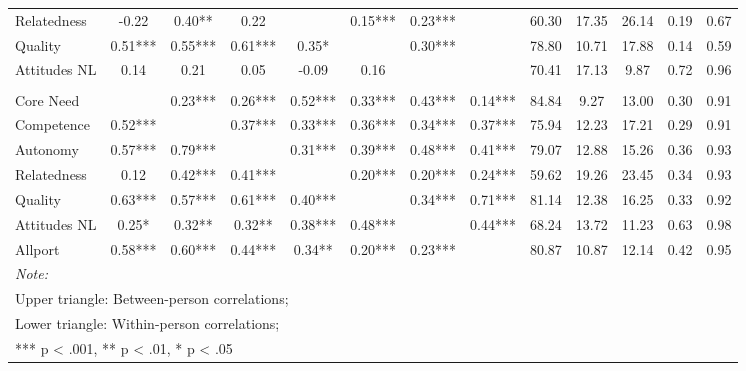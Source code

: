 \begin{table}
\begin{minipage}[t][\textheight][t]{\textwidth}
{\begin{tabular}[t]{lcccccccccccc}
\hspace{1em}Relatedness & -0.22 & 0.40** & 0.22 &  & 0.15*** & 0.23*** &  & 60.30 & 17.35 & 26.14 & 0.19 & 0.67\\
\hspace{1em}Quality & 0.51*** & 0.55*** & 0.61*** & 0.35* &  & 0.30*** &  & 78.80 & 10.71 & 17.88 & 0.14 & 0.59\\
\hspace{1em}Attitudes NL & 0.14 & 0.21 & 0.05 & -0.09 & 0.16 &  &  & 70.41 & 17.13 & 9.87 & 0.72 & 0.96\\
\addlinespace[0.3em]
\multicolumn{13}{l}{\textbf{Study 3}}\\
\hspace{1em}Core Need &  & 0.23*** & 0.26*** & 0.52*** & 0.33*** & 0.43*** & 0.14*** & 84.84 & 9.27 & 13.00 & 0.30 & 0.91\\
\hspace{1em}Competence & 0.52*** &  & 0.37*** & 0.33*** & 0.36*** & 0.34*** & 0.37*** & 75.94 & 12.23 & 17.21 & 0.29 & 0.91\\
\hspace{1em}Autonomy & 0.57*** & 0.79*** &  & 0.31*** & 0.39*** & 0.48*** & 0.41*** & 79.07 & 12.88 & 15.26 & 0.36 & 0.93\\
\hspace{1em}Relatedness & 0.12 & 0.42*** & 0.41*** &  & 0.20*** & 0.20*** & 0.24*** & 59.62 & 19.26 & 23.45 & 0.34 & 0.93\\
\hspace{1em}Quality & 0.63*** & 0.57*** & 0.61*** & 0.40*** &  & 0.34*** & 0.71*** & 81.14 & 12.38 & 16.25 & 0.33 & 0.92\\
\hspace{1em}Attitudes NL & 0.25* & 0.32** & 0.32** & 0.38*** & 0.48*** &  & 0.44*** & 68.24 & 13.72 & 11.23 & 0.63 & 0.98\\
\hspace{1em}Allport & 0.58*** & 0.60*** & 0.44*** & 0.34** & 0.20*** & 0.23*** &  & 80.87 & 10.87 & 12.14 & 0.42 & 0.95\\
\bottomrule
\multicolumn{13}{l}{\rule{0pt}{1em}\textit{Note: }}\\
\multicolumn{13}{l}{\rule{0pt}{1em}Upper triangle: Between-person correlations;}\\
\multicolumn{13}{l}{\rule{0pt}{1em}Lower triangle: Within-person correlations;}\\
\multicolumn{13}{l}{\rule{0pt}{1em}*** p < .001, ** p < .01,  * p < .05}\\
\end{tabular}}
\end{minipage}
\end{table}

